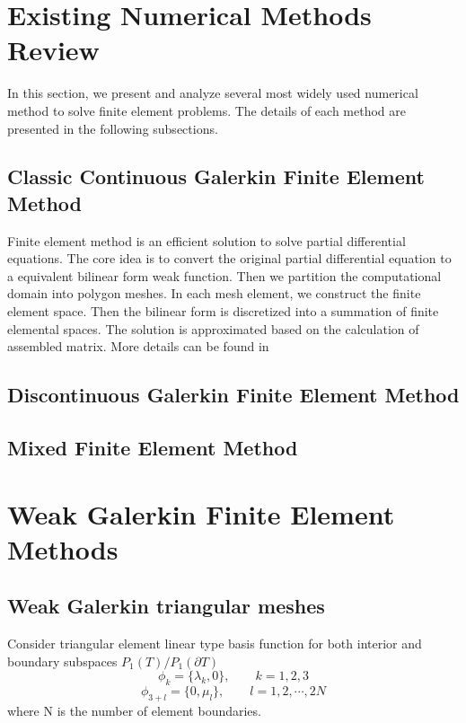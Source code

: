 \section{Existing Numerical Methods Review}
In this section, we present and analyze several most widely used numerical method to solve finite element problems. The details of each method are presented in the following subsections. 
\subsection{Classic Continuous Galerkin Finite Element Method}
Finite element method is an efficient solution to solve partial differential equations. The core idea is to convert the original partial differential equation to a equivalent bilinear form weak function. Then we partition the computational domain into polygon meshes. In each mesh element, we construct the finite element space. Then the bilinear form is discretized into a summation of finite elemental spaces. The solution is approximated based on the calculation of assembled matrix. More details can be found in \cite{zienkiewicz1977finite, ciarlet2002finite, hughes2012finite, reddy1993introduction}

\subsection{Discontinuous Galerkin Finite Element Method}


\subsection{Mixed Finite Element Method}



\section{Weak Galerkin Finite Element Methods}
\subsection{Weak Galerkin triangular meshes}

Consider triangular element linear type basis function for both interior and boundary subspaces $ P_{1}(T) / P_{1} (\partial T) $
\begin{equation}
\phi_{k} = \{ \lambda_{k}, 0 \}, \qquad k = 1,2, 3
\end{equation}
\begin{equation}
\phi_{3 + l} = \{ 0, \mu_{l} \}, \qquad l = 1, 2, \cdots , 2N
\end{equation}
where N is the number of element boundaries.

